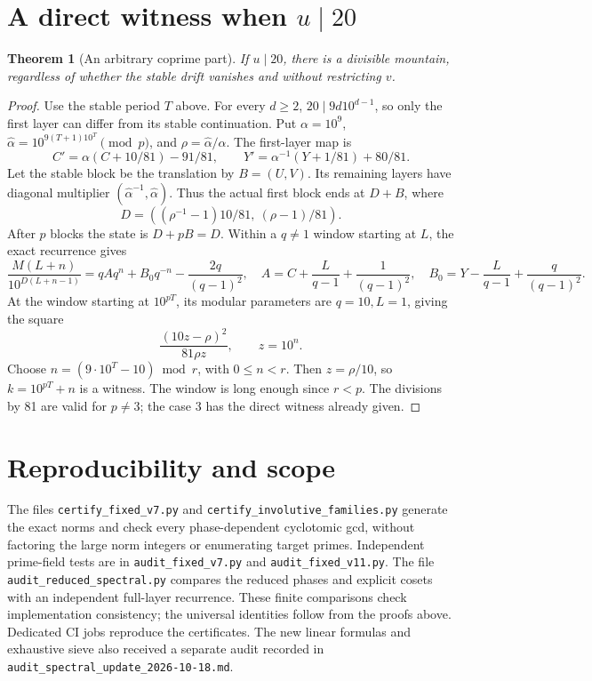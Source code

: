 \documentclass[10pt]{article}
\newtheorem{theorem}{Theorem}
\begin{document}
\section{A direct witness when \(u\mid20\)}
\begin{theorem}[An arbitrary coprime part]
If \(u\mid20\), there is a divisible mountain, regardless of whether
the stable drift vanishes and without restricting \(v\).
\end{theorem}
\begin{proof}
Use the stable period \(T\) above. For every \(d\ge2\),
\(20\mid9d10^{d-1}\), so only the first layer can differ from its
stable continuation. Put \(\alpha=10^9\),
\(\widehat\alpha=10^{9(T+1)10^T}\pmod p\),
and \(\rho=\widehat\alpha/\alpha\). The first-layer map is
\[
C'=\alpha(C+10/81)-91/81,\qquad
Y'=\alpha^{-1}(Y+1/81)+80/81.
\]
Let the stable block be the translation by \(B=(U,V)\).
Its remaining layers have diagonal multiplier
\((\widehat\alpha^{-1},\widehat\alpha)\). Thus the actual first
block ends at \(D+B\), where
\[
D=((\rho^{-1}-1)10/81,\ (\rho-1)/81).
\]
After \(p\) blocks the state is \(D+pB=D\).
Within a \(q\ne1\) window starting at \(L\), the exact recurrence gives
\[
\frac{M(L+n)}{10^{D(L+n-1)}}=qAq^n+B_0q^{-n}-\frac{2q}{(q-1)^2},
\quad
A=C+\frac L{q-1}+\frac1{(q-1)^2},\quad
B_0=Y-\frac L{q-1}+\frac q{(q-1)^2}.
\]
At the window starting at \(10^{pT}\), its modular parameters are
\(q=10,L=1\), giving the square
\[
\frac{(10z-\rho)^2}{81\rho z},\qquad z=10^n.
\]
Choose \(n=(9\cdot10^T-10)\bmod r\), with \(0\le n<r\).
Then \(z=\rho/10\), so \(k=10^{pT}+n\) is a witness. The window
is long enough since \(r<p\). The divisions by 81 are valid for
\(p\ne3\); the case 3 has the direct witness already given.
\end{proof}

\section{Reproducibility and scope}
The files \texttt{certify\_fixed\_v7.py} and
\texttt{certify\_involutive\_families.py} generate the exact norms and
check every phase-dependent cyclotomic gcd, without factoring
the large norm integers or enumerating target primes.
Independent prime-field tests are in
\texttt{audit\_fixed\_v7.py} and \texttt{audit\_fixed\_v11.py}.
The file \texttt{audit\_reduced\_spectral.py} compares the reduced
phases and explicit cosets with an independent full-layer recurrence.
These finite comparisons check implementation consistency; the universal
identities follow from the proofs above. Dedicated CI jobs reproduce
the certificates. The new linear formulas and exhaustive sieve also
received a separate audit recorded in
\texttt{audit\_spectral\_update\_2026-10-18.md}.
\end{document}
